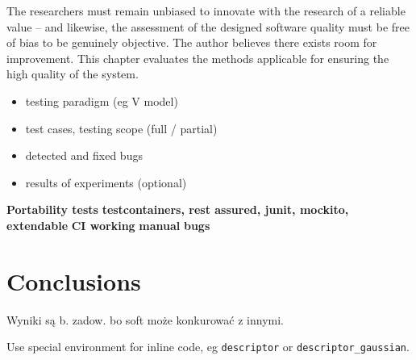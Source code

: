 \documentclass[a4paper,twoside,12pt]{book}
\newcounter{PagesWithoutNumbers}
\begin{document}
The researchers must remain unbiased to innovate with the research of a reliable value \cite{bib:objective_research} -- and likewise, the assessment of the designed software quality must be free of bias to be genuinely objective. The author believes there exists room for improvement. This chapter evaluates the methods applicable for ensuring the high quality of the system.

\begin{itemize}
\item testing paradigm (eg V model)
\item test cases, testing scope (full / partial)
\item detected and fixed bugs
\item results of experiments (optional)
\end{itemize}
\textbf{Portability tests}
\textbf{testcontainers, rest assured, junit, mockito, extendable}
\textbf{CI working}
\textbf{manual}
\textbf{bugs}

 
 

\chapter{Conclusions}

Wyniki są b. zadow. bo soft może konkurować z innymi.

Use special environment for inline code, eg \lstinline|descriptor| or \lstinline|descriptor_gaussian|.


\backmatter
{}
\setcounter{page}{\value{PagesWithoutNumbers}}

\pagestyle{onlyPageNumbers}

\printbibliography           %

\end{document}
